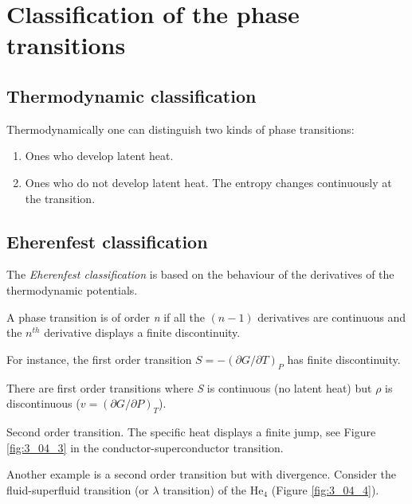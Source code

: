 \documentclass[../main/main.tex]{subfiles}
\begin{document}
\section{Classification of the phase transitions}

\subsection{Thermodynamic classification}
Thermodynamically one can distinguish two kinds of phase transitions:
\begin{enumerate}
\item Ones who develop latent heat.
\item Ones who do not develop latent heat. The entropy changes continuously at the transition.
\end{enumerate}
\subsection{Eherenfest classification}
The \emph{Eherenfest classification} is based on the behaviour of the derivatives of the thermodynamic potentials.

A phase transition is of order \emph{n} if all the \( (n-1) \)  derivatives are continuous and the \( n^{th} \) derivative displays a finite discontinuity.

\begin{example}{}{}
For instance, the first order transition \( S=-(\partial{G}/\partial{T}  )_P \) has finite discontinuity.
\end{example}
\begin{remark}
There are first order transitions where \emph{S} is continuous (no latent heat) but \( \rho  \) is discontinuous (\( v = (\partial{G}/\partial{P}  )_T \)).
\end{remark}
\begin{example}{}{}
Second order transition. The specific heat displays a finite jump, see Figure \ref{fig:3_04_3} in the conductor-superconductor transition.

Another example is a second order transition but with divergence. Consider the fluid-superfluid transition (or \( \lambda  \) transition) of the \( \text{He}_4 \) (Figure \ref{fig:3_04_4}).
\end{example}
\end{document}
